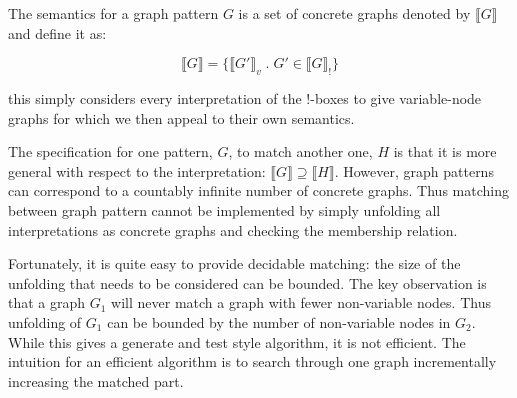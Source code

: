\documentclass[runningheads]{llncs}
\newcommand{\vinterp}[1]{\llbracket #1 \rrbracket_v}
\newcommand{\binterp}[1]{\llbracket #1 \rrbracket_!}
\newcommand{\minterp}[1]{\llbracket #1 \rrbracket}
\begin{document}




The semantics for a graph
pattern $G$ is a set of concrete graphs denoted by $\minterp{G}$ and
define it as:

$$\minterp{G} = \{\vinterp{G'}\;.\; G' \in \binterp{G}\}$$

\noindent this simply considers every interpretation of the !-boxes to
give variable-node graphs for which we then appeal to their own
semantics. 

The specification for one pattern,
$G$, to match another one, $H$ is that it is more general with respect
to the interpretation: $\minterp{G} \supseteq \minterp{H}$. However,
graph patterns can correspond to a countably infinite number of
concrete graphs. Thus matching between graph pattern cannot be
implemented by simply unfolding all interpretations as concrete graphs
and checking the membership relation.

Fortunately, it is quite easy to provide decidable matching: the size
of the unfolding that needs to be considered can be bounded. The key
observation is that a graph $G_1$ will never match a graph with fewer
non-variable nodes. Thus unfolding of $G_1$ can be bounded by the
number of non-variable nodes in $G_2$. While this gives a generate and
test style algorithm, it is not efficient. The intuition for an
efficient algorithm is to search through one graph incrementally
increasing the matched part.  
\end{document}
